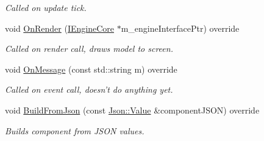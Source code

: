 \begin{DoxyCompactItemize}
\begin{DoxyCompactList}\small\item\em Called on update tick. \end{DoxyCompactList}\item 
\hypertarget{class_model_component_a2d6c1972533982e1a8c6444a6f0a4120}{void \hyperlink{class_model_component_a2d6c1972533982e1a8c6444a6f0a4120}{On\+Render} (\hyperlink{class_i_engine_core}{I\+Engine\+Core} $\ast$m\+\_\+engine\+Interface\+Ptr) override}\label{class_model_component_a2d6c1972533982e1a8c6444a6f0a4120}

\begin{DoxyCompactList}\small\item\em Called on render call, draws model to screen. \end{DoxyCompactList}\item 
\hypertarget{class_model_component_a48d6170e857f323839039ce54e9418e1}{void \hyperlink{class_model_component_a48d6170e857f323839039ce54e9418e1}{On\+Message} (const std\+::string m) override}\label{class_model_component_a48d6170e857f323839039ce54e9418e1}

\begin{DoxyCompactList}\small\item\em Called on event call, doesn't do anything yet. \end{DoxyCompactList}\item 
\hypertarget{class_model_component_ac77290f521c0bf24d370f88327b407d5}{void \hyperlink{class_model_component_ac77290f521c0bf24d370f88327b407d5}{Build\+From\+Json} (const \hyperlink{class_json_1_1_value}{Json\+::\+Value} \&component\+J\+S\+O\+N) override}\label{class_model_component_ac77290f521c0bf24d370f88327b407d5}

\begin{DoxyCompactList}\small\item\em Builds component from J\+S\+O\+N values. \end{DoxyCompactList}\end{DoxyCompactItemize}
